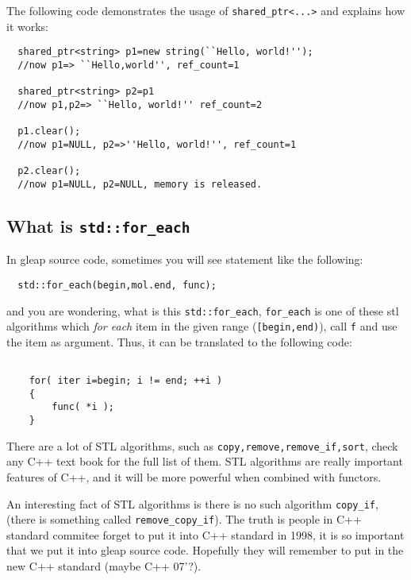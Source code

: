 \documentclass[letterpaper]{book}
\begin{document}
The following code demonstrates the usage of \lstinline$shared_ptr<...>$ and explains 
how it works:

\begin{lstlisting}
  shared_ptr<string> p1=new string(``Hello, world!''); 
  //now p1=> ``Hello,world'', ref_count=1

  shared_ptr<string> p2=p1 
  //now p1,p2=> ``Hello, world!'' ref_count=2

  p1.clear(); 
  //now p1=NULL, p2=>''Hello, world!'', ref_count=1

  p2.clear(); 
  //now p1=NULL, p2=NULL, memory is released.

\end{lstlisting}

\subsection*{What is \lstinline$std::for_each$}
In gleap source code, sometimes you will see statement like the following:

\begin{lstlisting}
  std::for_each(begin,mol.end, func);
\end{lstlisting}

and you are wondering, what is this \lstinline$std::for_each$, \lstinline$for_each$ 
is one of these stl algorithms which {\it for each} item in the given range
(\lstinline$[begin,end)$), call \lstinline$f$ and use the item as argument. Thus,
it can be translated to the following code: 

\begin{lstlisting}

    for( iter i=begin; i != end; ++i )
    {
        func( *i );
    }

\end{lstlisting}

There are a lot of STL algorithms, such as \lstinline$copy,remove,remove_if,sort$,
check any C++ text book for the full list of them. STL algorithms are really important
features of C++, and it will be more powerful when combined with functors. 

An interesting fact of STL algorithms is there is no such algorithm
\lstinline$copy_if$, (there is something called \lstinline$remove_copy_if$).
The truth is people in C++ standard commitee forget to put it into C++ standard
in 1998, it is so important that we put it into gleap source code.
Hopefully they will remember to put in the new C++ standard (maybe C++ 07'?).
\end{document}
